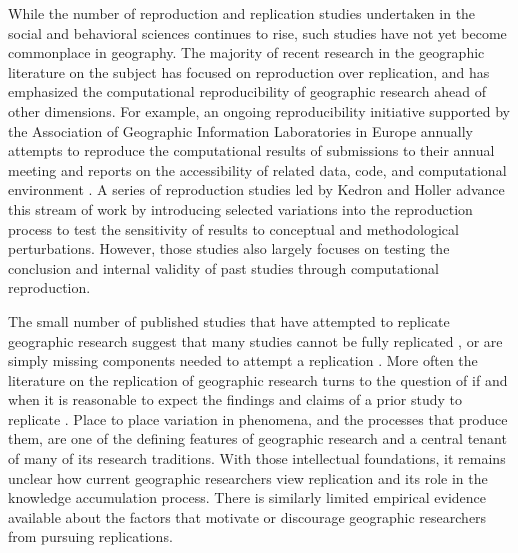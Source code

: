 \documentclass[]{interact}
\theoremstyle{plain}%
\theoremstyle{definition}
\theoremstyle{remark}
\begin{document}
While the number of reproduction and replication studies undertaken in the social and behavioral sciences continues to rise, such studies have not yet become commonplace in geography.
The majority of recent research in the geographic literature on the subject has focused on reproduction over replication, and has emphasized the computational reproducibility of geographic research ahead of other dimensions.
For example, an ongoing reproducibility initiative supported by the Association of Geographic Information Laboratories in Europe annually attempts to reproduce the computational results of submissions to their annual meeting and reports on the accessibility of related data, code, and computational environment \citep{nust2018, ostermann2021}.
A series of reproduction studies led by Kedron and Holler \citep{Kedron2023Beyond, Kedron_Holler_Bardin_Hilgendorf_2022} advance this stream of work by introducing selected variations into the reproduction process to test the sensitivity of results to conceptual and methodological perturbations. 
However, those studies also largely focuses on testing the conclusion and internal validity of past studies through computational reproduction. 

The small number of published studies that have attempted to replicate geographic research suggest that many studies cannot be fully replicated \citep[e.g.,][]{Kedron2022dimaggio, paez2022reproducibility}, or are simply missing components needed to attempt a replication \citep{konkol2019, ostermann2017}.
More often the literature on the replication of geographic research turns to the question of if and when it is reasonable to expect the findings and claims of a prior study to replicate \citep{kedron2021GA, kedron2022replication, goodchild2021replication, sui2021reproducibility}. 
Place to place variation in phenomena, and the processes that produce them, are one of the defining features of geographic research and a central tenant of many of its research traditions.
With those intellectual foundations, it remains unclear how current geographic researchers view replication and its role in the knowledge accumulation process.
There is similarly limited empirical evidence available about the factors that motivate or discourage geographic researchers from pursuing replications. 
\end{document}
